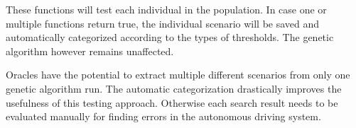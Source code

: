 These functions will test each individual in the population. In case one or multiple functions return true, the individual scenario will be saved and automatically categorized according to the types of thresholds. The genetic algorithm however remains unaffected.

Oracles have the potential to extract multiple different scenarios from only one genetic algorithm run. The automatic categorization drastically improves the usefulness of this testing approach. Otherwise each search result needs to be evaluated manually for finding errors in the autonomous driving system.
